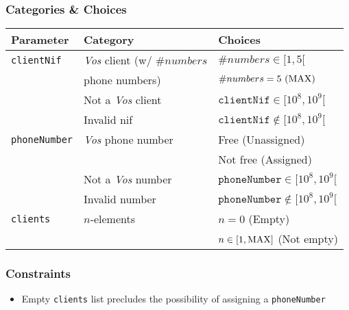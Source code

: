 \subsubsection{Categories \& Choices}
\label{sec:methods.assignPhoneNumber.choices}
\begin{table}[!hbtp]
  \centering
  \normalsize
  \begin{tabular}{|l|l|l|}
    \hline
    \textbf{Parameter} & \textbf{Category} & \textbf{Choices} \\ \hline
    \texttt{clientNif}
    & \textit{Vos} client (w/ $\#numbers$
      & $\#numbers \in [1,5[$     \\ \cline{3-3}
    & phone numbers)
      & $\#numbers = 5\ (\rm{MAX})$ \\ \cline{2-3}
    & Not a \textit{Vos} client
      & $\texttt{clientNif} \in [10^8,10^9[$ \\ \cline{2-3}
    & Invalid nif
      & $\texttt{clientNif} \notin [10^8,10^9[$ \\ \hline
    \texttt{phoneNumber}
    & \textit{Vos} phone number
      & Free (Unassigned)   \\ \cline{3-3}
    & & Not free (Assigned) \\ \cline{2-3}
    & Not a \textit{Vos} number
      & $\texttt{phoneNumber} \in [10^8,10^9[$\\ \cline{2-3}
    & Invalid number
      & $\texttt{phoneNumber} \notin [10^8,10^9[$ \\ \hline
    \texttt{clients}
    & $n$-elements
      & $n = 0$ (Empty)                  \\ \cline{3-3}
    & & $n \in [1,\rm{MAX}]$ (Not empty) \\ \hline
  \end{tabular}
\end{table}

\subsubsection{Constraints}
\label{sec:methods.assignPhoneNumber.constraints}
\begin{itemize}
  \normalsize
  \item Empty \texttt{clients} list precludes the possibility of assigning a
        \texttt{phoneNumber}
\end{itemize}

